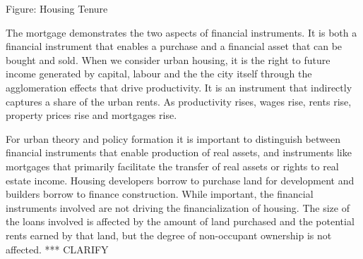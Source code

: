 \begin{center}
\end{center}

Figure: Housing Tenure 

The mortgage demonstrates the two aspects of financial instruments. It is both a financial instrument that enables a purchase and a financial asset that can be bought and sold. When we consider urban housing, it is the right to future income generated by capital, labour and the the city itself through the agglomeration effects that drive productivity. It is an instrument that indirectly captures a share of the urban rents. As productivity rises, wages rise, rents rise, property prices rise and mortgages rise. 

For urban theory and policy formation it is important to distinguish between financial instruments that enable production of real assets, and instruments like  mortgages that primarily facilitate the transfer of real assets or rights to real estate  income. Housing developers borrow to purchase land for development and builders borrow to finance construction. While important, the financial instruments involved are not driving the financialization of housing.  The size of the loans involved is affected by the amount of land purchased and the potential rents earned by that land, but the degree of non-occupant ownership is not affected. *** CLARIFY
  
